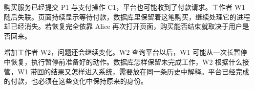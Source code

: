 \newcommand{\CEightFigure}[3]{%
  \begin{figure}[htbp]
  \centering
  \begingroup
  \definecolor{Blue}{HTML}{315E76}
  \definecolor{Pale}{HTML}{F1F5F7}
  \definecolor{Gold}{HTML}{A96B34}
  \tikzset{every node/.style={font=\small\sffamily,align=center},
    box/.style={draw=Blue,rounded corners=2pt,fill=Pale,inner sep=7pt,text width=3.6cm,minimum height=1cm},
    good/.style={box,fill=green!5!white,draw=green!35!black},
    warn/.style={box,fill=orange!7,draw=Gold},
    arr/.style={-{Stealth[length=2mm]},thick,draw=Blue},
    note/.style={font=\footnotesize\sffamily,align=center,text=black!75},
    lane/.style={draw=black!35,densely dashed}}
  \resizebox{.98\linewidth}{!}{}
  \endgroup
  \caption{#2}\label{#3}
  \end{figure}}

购买服务已经提交 P1 与支付操作 C1，平台也可能收到了付款请求。工作者 W1 随后失联。页面持续显示等待付款，数据库里保留着这笔购买，继续处理它的进程却已经消失。若恢复完全依靠 Alice 再次打开页面，购买能否结束就取决于用户是否回来。

增加工作者 W2，问题还会继续变化。W2 查询平台以后，W1 可能从一次长暂停中恢复，执行暂停前准备好的动作。数据库怎样保留未完成工作，W2 根据什么接管，W1 带回的结果又怎样进入系统，需要放在同一条历史中解释。平台已经完成的付款，也必须在这些变化中保持原来的身份。
